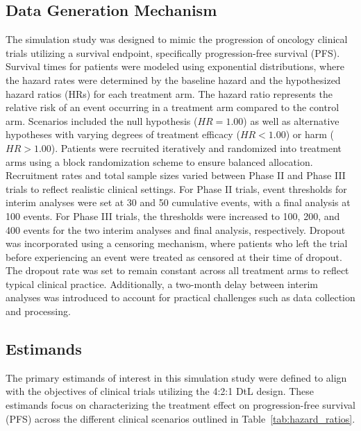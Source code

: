 \documentclass[11pt, a4paper]{article}\usepackage[]{graphicx}\usepackage[]{xcolor}
\begin{document}
\subsection*{Data Generation Mechanism}
The simulation study was designed to mimic the progression of oncology clinical trials utilizing a survival endpoint, specifically progression-free survival (PFS). Survival times for patients were modeled using exponential distributions, where the hazard rates were determined by the baseline hazard and the hypothesized hazard ratios (HRs) for each treatment arm. The hazard ratio represents the relative risk of an event occurring in a treatment arm compared to the control arm. Scenarios included the null hypothesis (\(HR = 1.00\)) as well as alternative hypotheses with varying degrees of treatment efficacy (\(HR < 1.00\)) or harm (\(HR > 1.00\)). Patients were recruited iteratively and randomized into treatment arms using a block randomization scheme to ensure balanced allocation. Recruitment rates and total sample sizes varied between Phase II and Phase III trials to reflect realistic clinical settings. For Phase II trials, event thresholds for interim analyses were set at 30 and 50 cumulative events, with a final analysis at 100 events. For Phase III trials, the thresholds were increased to 100, 200, and 400 events for the two interim analyses and final analysis, respectively. Dropout was incorporated using a censoring mechanism, where patients who left the trial before experiencing an event were treated as censored at their time of dropout. The dropout rate was set to remain constant across all treatment arms to reflect typical clinical practice. Additionally, a two-month delay between interim analyses was introduced to account for practical challenges such as data collection and processing.

\subsection*{Estimands}
The primary estimands of interest in this simulation study were defined to align with the objectives of clinical trials utilizing the 4:2:1 DtL design. These estimands focus on characterizing the treatment effect on progression-free survival (PFS) across the different clinical scenarios outlined in Table~\ref{tab:hazard_ratios}.
\end{document}
